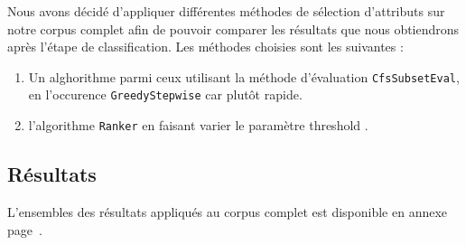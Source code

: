 Nous avons décidé d'appliquer différentes méthodes de sélection d'attributs sur notre corpus complet afin de pouvoir comparer les résultats que nous obtiendrons après l'étape de classification. Les méthodes choisies sont les suivantes : 

\begin{enumerate}
\item Un alghorithme parmi ceux utilisant la méthode d'évaluation \texttt{CfsSubsetEval}, en l'occurence \texttt{GreedyStepwise} car plutôt rapide.
\item l'algorithme \texttt{Ranker} en faisant varier le paramètre \og threshold \fg{}.
\end{enumerate}

\subsection{Résultats}

L'ensembles des résultats appliqués au corpus complet est disponible en annexe page~\pageref{annexe:results}.